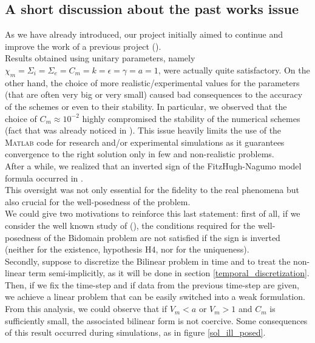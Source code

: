 \documentclass[a4paper,11pt]{article}
\begin{document}
    \subsection{A short discussion about the past works issue}
    As we have already introduced, our project initially aimed to continue and improve the work of a previous project (\parencite{marta}). \\
    Results obtained using unitary parameters, namely $\chi_m =\Sigma_i= \Sigma_e= C_m= k = \epsilon= \gamma= a=1$, were actually quite satisfactory. On the other hand, the choice of more realistic/experimental values for the parameters (that are often very big or very small) caused bad consequences to the accuracy of the schemes or even to their stability. In particular, we observed that the choice of $C_m \approx 10^{-2}$ highly compromised the stability of the numerical schemes (fact that was already noticed in \cite{andreotti}).
    This issue heavily limits the use of the \textsc{Matlab} code for research and/or experimental simulations as it guarantees convergence to the right solution only in few and non-realistic problems.  \\

    \noindent After a while, we realized that an inverted sign of the FitzHugh-Nagumo model formula occurred in \cite{acta}. \\

    \noindent This oversight was not only essential for the fidelity to the real phenomena but also crucial for the well-posedness of the problem.\\ 
    We could give two motivations to reinforce this last statement: first of all, if we consider the well known study of \citeauthor{bourgault} (\cite{bourgault}), the conditions required for the well-posedness of the Bidomain problem are not satisfied if the sign is inverted (neither for the existence, hypothesis H4, nor for the uniqueness).\\ Secondly, suppose to discretize the Bilinear problem in time and to treat the non-linear term semi-implicitly, as it will be done in section \ref{temporal_discretization}. Then, if we fix the time-step and if data from the previous time-step are given, we achieve a linear problem that can be easily switched into a weak formulation. From this analysis, we could observe that if $V_m<a$ or $V_m>1$ and $C_m$ is sufficiently small, the associated bilinear form is not coercive. Some consequences of this result occurred during simulations, as in figure \ref{sol_ill_posed}. \\
    
\end{document}
